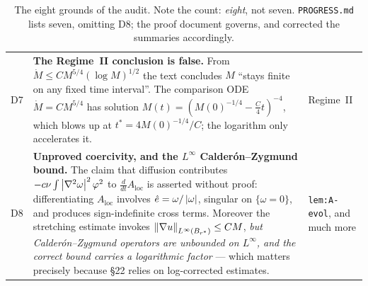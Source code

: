 \begin{table}[ht]
\begin{tabular}{@{}l p{} l@{}}
D7 & \textbf{The Regime~II conclusion is false.} From
  \(\dot M\le CM^{5/4}(\log M)^{1/2}\) the text concludes \(M\) ``stays finite
  on any fixed time interval''. The comparison ODE \(\dot M=CM^{5/4}\) has
  solution \(M(t)=(M(0)^{-1/4}-\tfrac C4t)^{-4}\), which blows up at
  \(t^*=4M(0)^{-1/4}/C\); the logarithm only accelerates it.
  & Regime~II \\[3pt]
D8 & \textbf{Unproved coercivity, and the \(L^\infty\)
  Calder\'on--Zygmund bound.} The claim that diffusion contributes
  \(-c\nu\int\left|\nabla^2\omega\right|^2\varphi^2\) to
  \(\tfrac{d}{dt}A_{\mathrm{loc}}\) is asserted without proof: differentiating
  \(A_{\mathrm{loc}}\) involves \(\hat{e}=\omega/\left|\omega\right|\), singular on
  \(\{\omega=0\}\), and produces sign-indefinite cross terms. Moreover the
  stretching estimate invokes
  \(\left\|\nabla u\right\|_{L^\infty(B_{r^{*}})}\le CM\), \emph{but
  Calder\'on--Zygmund operators are unbounded on \(L^\infty\), and the correct
  bound carries a logarithmic factor} --- which matters precisely because
  \S22 relies on log-corrected estimates.
  & \texttt{lem:A-evol}, and much more \\
\bottomrule
\end{tabular}
\caption[The eight defects]{The eight grounds of the  audit. Note the
count: \emph{eight}, not seven. \texttt{PROGRESS.md} lists seven, omitting D8;
the proof document governs, and  corrected the summaries
accordingly.}
\label{tab:eight-defects}
\end{table}


